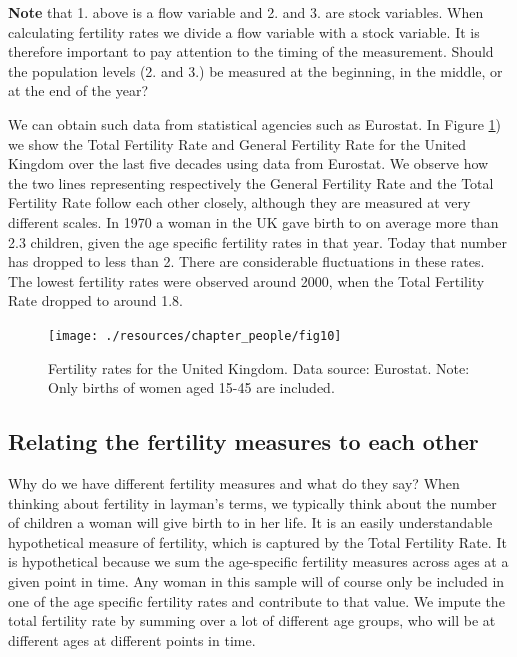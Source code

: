 \documentclass[
]{book}
\begin{document}
\textbf{Note} that 1. above is a flow variable and 2. and 3. are stock variables. When calculating fertility rates we divide a flow variable with a stock variable. It is therefore important to pay attention to the timing of the measurement. Should the population levels (2. and 3.) be measured at the beginning, in the middle, or at the end of the year?

We can obtain such data from statistical agencies such as Eurostat. In Figure \ref{fig:death1}) we show the Total Fertility Rate and General Fertility Rate for the United Kingdom over the last five decades using data from Eurostat. We observe how the two lines representing respectively the General Fertility Rate and the Total Fertility Rate follow each other closely, although they are measured at very different scales. In 1970 a woman in the UK gave birth to on average more than 2.3 children, given the age specific fertility rates in that year. Today that number has dropped to less than 2. There are considerable fluctuations in these rates. The lowest fertility rates were observed around 2000, when the Total Fertility Rate dropped to around 1.8.

\begin{figure}

{\centering \texttt{[image: ./resources/chapter\_people/fig10]} 

}

\caption{Fertility rates for the United Kingdom. Data source: Eurostat. Note: Only births of women aged 15-45 are included.}\label{fig:death1}
\end{figure}

\hypertarget{relating-the-fertility-measures-to-each-other}{%
\subsection{Relating the fertility measures to each other}\label{relating-the-fertility-measures-to-each-other}}

Why do we have different fertility measures and what do they say? When thinking about fertility in layman's terms, we typically think about the number of children a woman will give birth to in her life. It is an easily understandable hypothetical measure of fertility, which is captured by the Total Fertility Rate. It is hypothetical because we sum the age-specific fertility measures across ages at a given point in time. Any woman in this sample will of course only be included in one of the age specific fertility rates and contribute to that value. We impute the total fertility rate by summing over a lot of different age groups, who will be at different ages at different points in time.
\end{document}
